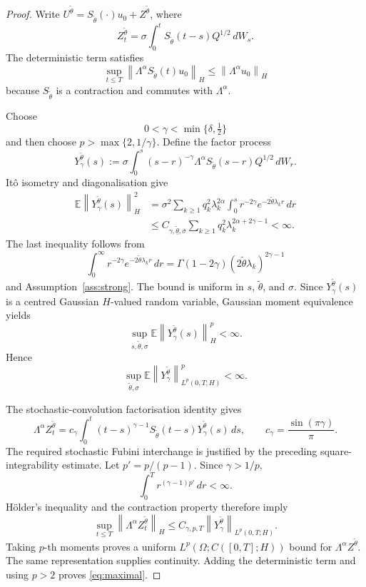 \documentclass[11pt]{article}
\theoremstyle{remark}
\newcommand{\E}{\mathbb E}
\newcommand{\1}{\mathbf 1}
\newcommand{\norm}[1]{\left\lVert #1\right\rVert}
\newcommand{\hnorm}[1]{\left\lVert #1\right\rVert_H}
\newcommand{\thetamin}{\underline{\widetilde\theta}}
\newcommand{\sigmamax}{\overline\sigma}
\newcommand{\Lambdaop}{\Lambda}
\begin{document}
\begin{proof}
Write \(U^{\widetilde\theta}=S_{\widetilde\theta}(\cdot)u_0+Z^{\widetilde\theta}\), where
\[
 Z_t^{\widetilde\theta}
 =\sigma\int_0^tS_{\widetilde\theta}(t-s)Q^{1/2}\,dW_s.
\]
The deterministic term satisfies
\[
 \sup_{t\le T}\hnorm{\Lambdaop^\alpha S_{\widetilde\theta}(t)u_0}
 \le\hnorm{\Lambdaop^\alpha u_0}
\]
because \(S_{\widetilde\theta}\) is a contraction and commutes with \(\Lambdaop^\alpha\).

Choose
\[
 0<\gamma<\min\{\delta,\tfrac12\}
\]
and then choose \(p>\max\{2,1/\gamma\}\).  Define the factor process
\[
 Y_{\gamma}^{\widetilde\theta}(s)
 :=\sigma\int_0^s
 (s-r)^{-\gamma}
 \Lambdaop^\alpha S_{\widetilde\theta}(s-r)Q^{1/2}\,dW_r.
\]
It\^o isometry and diagonalisation give
\begin{align*}
 \E\hnorm{Y_{\gamma}^{\widetilde\theta}(s)}^2
 &=\sigma^2\sum_{k\ge1}q_k^2\lambda_k^{2\alpha}
 \int_0^s r^{-2\gamma}e^{-2\widetilde\theta\lambda_kr}\,dr\\
 &\le C_{\gamma,\thetamin,\sigmamax}
 \sum_{k\ge1}q_k^2\lambda_k^{2\alpha+2\gamma-1}<\infty.
\end{align*}
The last inequality follows from
\[
 \int_0^\infty r^{-2\gamma}e^{-2\widetilde\theta\lambda_kr}\,dr
 =\Gamma(1-2\gamma)(2\widetilde\theta\lambda_k)^{2\gamma-1}
\]
and Assumption~\ref{ass:strong}.  The bound is uniform in \(s\), \(\widetilde\theta\), and \(\sigma\).  Since \(Y_\gamma^{\widetilde\theta}(s)\) is a centred Gaussian \(H\)-valued random variable, Gaussian moment equivalence yields
\[
 \sup_{s,\widetilde\theta,\sigma}
 \E\hnorm{Y_{\gamma}^{\widetilde\theta}(s)}^p<\infty.
\]
Hence
\[
 \sup_{\widetilde\theta,\sigma}
 \E\norm{Y_{\gamma}^{\widetilde\theta}}_{L^p(0,T;H)}^p<\infty.
\]

The stochastic-convolution factorisation identity gives
\begin{equation}\label{eq:factor}
 \Lambdaop^\alpha Z_t^{\widetilde\theta}
 =c_\gamma\int_0^t
 (t-s)^{\gamma-1}S_{\widetilde\theta}(t-s)
 Y_{\gamma}^{\widetilde\theta}(s)\,ds,
 \qquad
 c_\gamma=\frac{\sin(\pi\gamma)}{\pi}.
\end{equation}
The required stochastic Fubini interchange is justified by the preceding square-integrability estimate.  Let \(p'=p/(p-1)\).  Since \(\gamma>1/p\),
\[
 \int_0^T r^{(\gamma-1)p'}\,dr<\infty.
\]
H\"older's inequality and the contraction property therefore imply
\[
 \sup_{t\le T}\hnorm{\Lambdaop^\alpha Z_t^{\widetilde\theta}}
 \le C_{\gamma,p,T}
 \norm{Y_{\gamma}^{\widetilde\theta}}_{L^p(0,T;H)}.
\]
Taking \(p\)-th moments proves a uniform \(L^p(\Omega;C([0,T];H))\) bound for \(\Lambdaop^\alpha Z^{\widetilde\theta}\).  The same representation supplies continuity.  Adding the deterministic term and using \(p>2\) proves \eqref{eq:maximal}.
\end{proof}
\end{document}
